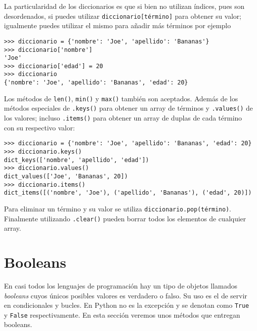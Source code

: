 \documentclass[11pt,twoside]{report}
\begin{document}
La particularidad de los diccionarios es que si bien no utilizan índices, pues son desordenados, si puedes utilizar \lstinline|diccionario[término]| para obtener su valor; igualmente puedes utilizar el mismo para añadir más términos por ejemplo
\begin{lstlisting}
>>> diccionario = {'nombre': 'Joe', 'apellido': 'Bananas'}
>>> diccionario['nombre']
'Joe'
>>> diccionario['edad'] = 20
>>> diccionario
{'nombre': 'Joe', 'apellido': 'Bananas', 'edad': 20}
\end{lstlisting}
Los métodos de \lstinline|len()|, \lstinline|min()| y \lstinline|max()| también son aceptados. Además de los métodos especiales de \lstinline|.keys()| para obtener un array de términos y \lstinline|.values()| de los valores; incluso \lstinline|.items()| para obtener un array de duplas de cada término con su respectivo valor:
\begin{lstlisting}
>>> diccionario = {'nombre': 'Joe', 'apellido': 'Bananas', 'edad': 20}
>>> diccionario.keys()
dict_keys(['nombre', 'apellido', 'edad'])
>>> diccionario.values()
dict_values(['Joe', 'Bananas', 20])
>>> diccionario.items()
dict_items([('nombre', 'Joe'), ('apellido', 'Bananas'), ('edad', 20)])
\end{lstlisting}
Para eliminar un término y su valor se utiliza \lstinline|diccionario.pop(término)|. Finalmente utilizando \lstinline|.clear()| pueden borrar todos los elementos de cualquier array.

\section{Booleans}
En casi todos los lenguajes de programación hay un tipo de objetos llamados \textit{booleans} cuyos únicos posibles valores es verdadero o falso. Su uso es el de servir en condicionales y bucles. En Python no es la excepción y se denotan como \lstinline|True| y \lstinline|False| respectivamente. En esta sección veremos unos métodos que entregan booleans.
\end{document}
